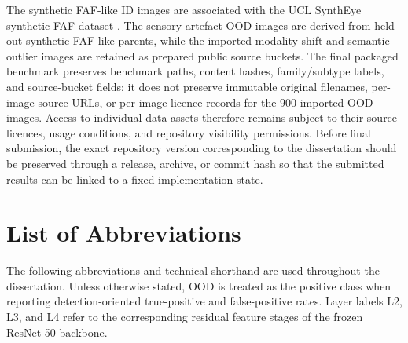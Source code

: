 \documentclass[fleqn,12pt]{olplainarticle}
\begin{document}
The synthetic FAF-like ID images are associated with the UCL SynthEye synthetic
FAF dataset \cite{uclSyntheyeDataset2025}. The sensory-artefact OOD images are
derived from held-out synthetic FAF-like parents, while the imported
modality-shift and semantic-outlier images are retained as prepared public
source buckets. The final packaged benchmark preserves benchmark paths,
content hashes, family/subtype labels, and source-bucket fields; it does not
preserve immutable original filenames, per-image source URLs, or per-image
licence records for the 900 imported OOD images. Access to individual data
assets therefore remains subject to their source licences, usage conditions,
and repository visibility permissions. Before final submission, the exact
repository version corresponding to the dissertation should be preserved
through a release, archive, or commit hash so that the submitted results can be
linked to a fixed implementation state.

\clearpage

\tableofcontents

\clearpage
\listoffigures

\clearpage
\listoftables

\clearpage



\section*{List of Abbreviations}
{}

The following abbreviations and technical shorthand are used throughout the
dissertation. Unless otherwise stated, OOD is treated as the positive class
when reporting detection-oriented true-positive and false-positive rates.
Layer labels L2, L3, and L4 refer to the corresponding residual feature stages
of the frozen ResNet-50 backbone.

\vspace{0.6em}

\renewcommand{\arraystretch}{1.14}
\setlength{\LTpre}{0pt}
\setlength{\LTpost}{0pt}
\end{document}
